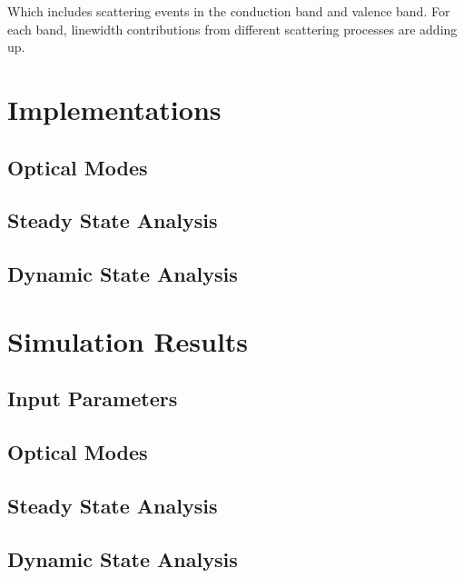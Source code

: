 Which includes scattering events in the conduction band and valence band. For
each band, linewidth contributions from different scattering processes are
adding up.

\section{Implementations} \label{corrections}
\subsection{Optical Modes}
\subsection{Steady State Analysis}
\subsection{Dynamic State Analysis}

\section{Simulation Results} \label{corrections}
\subsection{Input Parameters}
\subsection{Optical Modes}
\subsection{Steady State Analysis}
\subsection{Dynamic State Analysis}
